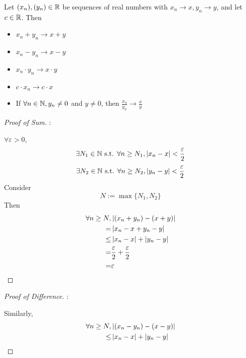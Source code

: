 \documentclass[a4paper,12pt]{article}
\begin{document}
\begin{theorem}
    Let \((x_{n}), (y_{n})\in\mathbb{R}\) be sequences of real numbers with \(x_n\rightarrow x, y_n\rightarrow y\), 
    and let \(c\in\mathbb{R}\).
    Then
    \begin{itemize}
        \item \(x_n+y_n\rightarrow x+y\)
        \item \(x_n-y_n\rightarrow x-y\)
        \item \(x_n\cdot y_n\rightarrow x\cdot y\)
        \item \(c\cdot x_n\rightarrow c\cdot x\)
        \item If \(\forall n\in\mathbb{N}, y_n\neq 0\) and \(y\neq 0\), then \(\frac{x_n}{y_n}\rightarrow \frac{x}{y}\)
    \end{itemize}

    \newpage
    \begin{proof}[Proof of Sum]:

        \(\forall \varepsilon>0\),
        \[\exists N_1\in\mathbb{N} \text{ s.t. } \forall n\ge N_1, \left\lvert x_n-x\right\rvert<\frac{\varepsilon}{2}\]
        \[\exists N_2\in\mathbb{N} \text{ s.t. } \forall n\ge N_2, \left\lvert y_n-y\right\rvert<\frac{\varepsilon}{2}\]
        Consider \[N:=\max{\{N_1,N_2\}}\]
        Then
        \begin{align*}
            \forall n\ge N, &\left\lvert (x_n+y_n)-(x+y)\right\rvert\\
            =&\left\lvert x_n-x+y_n-y\right\rvert\\
            \le& \left\lvert x_n-x\right\rvert+\left\lvert y_n-y\right\rvert\\
            =&\frac{\varepsilon}{2}+\frac{\varepsilon}{2}\\
            =&\varepsilon
        \end{align*}
    \end{proof}

    \begin{proof}[Proof of Difference]:

        Similarly,
        \begin{align*}
            \forall n\ge N, &\left\lvert (x_n-y_n)-(x-y)\right\rvert\\
            \le& \left\lvert x_n-x\right\rvert+\left\lvert y_n-y\right\rvert
        \end{align*}
    \end{proof}


\end{theorem}
\end{document}
